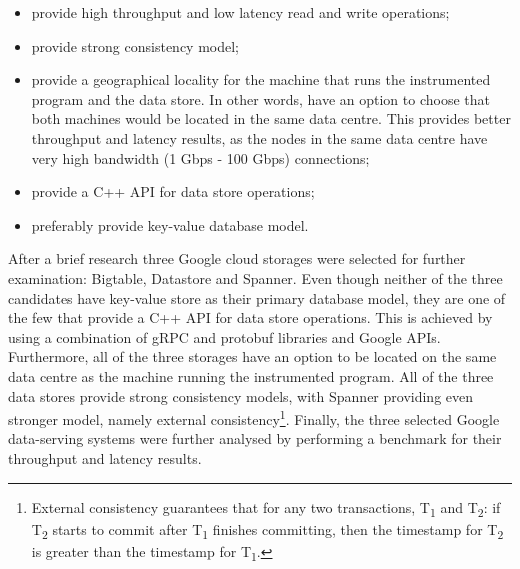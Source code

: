 \documentclass[bsc,frontabs,twoside,singlespacing,parskip,deptreport]{infthesis}     %
\begin{document}
\begin{itemize}
\item
provide high throughput and low latency read and write operations;
\item
provide strong consistency model;
\item
provide a geographical locality for the machine that runs the instrumented program and the data store. In other words, have an option to choose that both machines would be located in the same data centre. This provides better throughput and latency results, as the nodes in the same data centre have very high bandwidth (1 Gbps - 100 Gbps) connections;
\item
provide a C++ API for data store operations;
\item
preferably provide key-value database model.
\end{itemize}

After a brief research three Google cloud storages were selected for further examination: Bigtable, Datastore and Spanner. Even though neither of the three candidates have key-value store as their primary database model, they are one of the few that provide a C++ API for data store operations. This is achieved by using a combination of gRPC and protobuf libraries and Google APIs. Furthermore, all of the three storages have an option to be located on the same data centre as the machine running the instrumented program. All of the three data stores provide strong consistency models, with Spanner providing even stronger model, namely external consistency\footnote{External consistency guarantees that for any two transactions, T\textsubscript{1} and T\textsubscript{2}: if T\textsubscript{2} starts to commit after T\textsubscript{1} finishes committing, then the timestamp for T\textsubscript{2} is greater than the timestamp for T\textsubscript{1}.}. Finally, the three selected Google data-serving systems were further analysed by performing a benchmark for their throughput and latency results.


\end{document}
